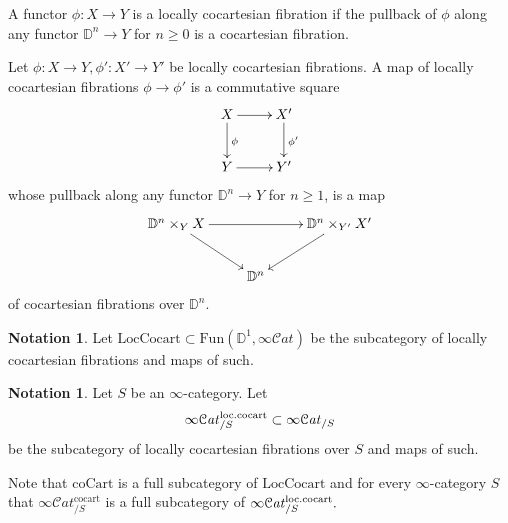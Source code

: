 \documentclass[10pt,oneside]{article}
\numberwithin{equation}{section} %
\numberwithin{figure}{section} %
\theoremstyle{plain}
\theoremstyle{definition}
\newtheorem{notation}[thm]{Notation}
\newcommand{\bD}{{\mathbb D}}
\newcommand{\Fun}{\mathrm{Fun}}
\newcommand{\cocart}{{\mathrm{cocart}}}
\newcommand{\scat}{\mathcal{C}\mathit{at}}
\begin{document}
\begin{definition}

A functor $\phi: X \to Y$ is a locally cocartesian fibration if the pullback of $\phi$ along any functor $\bD^n \to Y$ for $n \geq 0$ is a 
cocartesian fibration.
    
\end{definition}

\begin{definition}Let $\phi: X \to Y, \phi': X' \to Y' $ be locally cocartesian fibrations.
A map of locally cocartesian fibrations $\phi \to \phi'$ is a  commutative square
$$\begin{xy}
\xymatrix{
X \ar[d]^{\phi} \ar[r]
& X' \ar[d]^{\phi'} 
\\ 
Y \ar[r] & Y'}
\end{xy}$$	
whose pullback along any functor $\bD^n \to Y$ for $n \geq 1$, 
is a map 
$$\begin{xy}
\xymatrix{
\bD^n \times_Y X \ar[rd] \ar[rr]
&& \bD^n \times_{Y'} X' \ar[ld]
\\ 
& \bD^n}
\end{xy}$$	
of cocartesian fibrations over $\bD^n$.

\end{definition}

\begin{notation}

Let $ \mathrm{Loc}\mathrm{Cocart} \subset \Fun(\bD^1, \infty\scat) $
be the subcategory of locally cocartesian fibrations and maps of such.

\end{notation}

\begin{notation}Let $S$ be an $\infty$-category.
Let $$\infty\scat^{\mathrm{loc}. \vspace{1mm} \cocart}_{/S} \subset \infty\scat_{/S}$$ be the subcategory of locally cocartesian fibrations over $S$ and maps of such.

\end{notation}

\begin{remark}

Note that $\mathrm{coCart} $ is a full subcategory of $ \mathrm{Loc}\mathrm{Cocart} $ and for every $\infty$-category $S$
that $\infty\scat^{\cocart}_{/S} $ is a full subcategory of $\infty\scat^{\mathrm{loc}. \vspace{1mm} \cocart}_{/S}.$
    
\end{remark}
\end{document}
